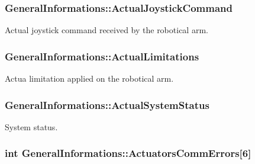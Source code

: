 \subsubsection[{\texorpdfstring{Actual\+Joystick\+Command}{ActualJoystickCommand}}]{ General\+Informations\+::\+Actual\+Joystick\+Command}\hypertarget{struct_general_informations_ac410a6988b0b124a005e0669c9f2172a}{}\label{struct_general_informations_ac410a6988b0b124a005e0669c9f2172a}


Actual joystick command received by the robotical arm. 

\subsubsection[{\texorpdfstring{Actual\+Limitations}{ActualLimitations}}]{ General\+Informations\+::\+Actual\+Limitations}\hypertarget{struct_general_informations_a025752cc70001b073d606f277c410d93}{}\label{struct_general_informations_a025752cc70001b073d606f277c410d93}


Actua limitation applied on the robotical arm. 

\subsubsection[{\texorpdfstring{Actual\+System\+Status}{ActualSystemStatus}}]{ General\+Informations\+::\+Actual\+System\+Status}\hypertarget{struct_general_informations_ac1ff05432bd5c95b73b50b9d38830105}{}\label{struct_general_informations_ac1ff05432bd5c95b73b50b9d38830105}


System status. 

\subsubsection[{\texorpdfstring{Actuators\+Comm\+Errors}{ActuatorsCommErrors}}]{\setlength{\rightskip}{0pt plus 5cm}int General\+Informations\+::\+Actuators\+Comm\+Errors\mbox{[}6\mbox{]}}\hypertarget{struct_general_informations_a7281486ac36892c876e30962656660ee}{}\label{struct_general_informations_a7281486ac36892c876e30962656660ee}



